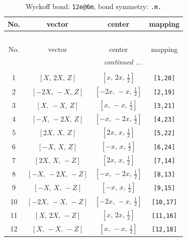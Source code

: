 \documentclass[fleqn,8pt]{jsarticle}
\begin{document}
\renewcommand{\arraystretch}{1.2}
\begin{longtable}{cccc}
\caption{Wyckoff bond: {\tt 12e@6m}, bond symmetry: {\tt .m.}}
 \\
 \hline \hline
No. & vector & center & mapping \\ \hline \endfirsthead

\multicolumn{3}{l}{\tablename\ \thetable{}} \\
 \hline \hline
No. & vector & center & mapping \\ \hline \endhead

 \hline \hline
\multicolumn{3}{r}{\footnotesize\it continued ...} \\ \endfoot

 \hline \hline
\multicolumn{3}{r}{} \\ \endlastfoot

1 & $\left[ X,\, 2 X,\, Z \right]$ & $\left[ x,\, 2 x,\, \frac{1}{2} \right]$ & {\tt [1,20]} \\ \hline
2 & $\left[ - 2 X,\, - X,\, Z \right]$ & $\left[ - 2 x,\, - x,\, \frac{1}{2} \right]$ & {\tt [2,19]} \\ \hline
3 & $\left[ X,\, - X,\, Z \right]$ & $\left[ x,\, - x,\, \frac{1}{2} \right]$ & {\tt [3,21]} \\ \hline
4 & $\left[ - X,\, - 2 X,\, Z \right]$ & $\left[ - x,\, - 2 x,\, \frac{1}{2} \right]$ & {\tt [4,23]} \\ \hline
5 & $\left[ 2 X,\, X,\, Z \right]$ & $\left[ 2 x,\, x,\, \frac{1}{2} \right]$ & {\tt [5,22]} \\ \hline
6 & $\left[ - X,\, X,\, Z \right]$ & $\left[ - x,\, x,\, \frac{1}{2} \right]$ & {\tt [6,24]} \\ \hline
7 & $\left[ 2 X,\, X,\, - Z \right]$ & $\left[ 2 x,\, x,\, \frac{1}{2} \right]$ & {\tt [7,14]} \\ \hline
8 & $\left[ - X,\, - 2 X,\, - Z \right]$ & $\left[ - x,\, - 2 x,\, \frac{1}{2} \right]$ & {\tt [8,13]} \\ \hline
9 & $\left[ - X,\, X,\, - Z \right]$ & $\left[ - x,\, x,\, \frac{1}{2} \right]$ & {\tt [9,15]} \\ \hline
10 & $\left[ - 2 X,\, - X,\, - Z \right]$ & $\left[ - 2 x,\, - x,\, \frac{1}{2} \right]$ & {\tt [10,17]} \\ \hline
11 & $\left[ X,\, 2 X,\, - Z \right]$ & $\left[ x,\, 2 x,\, \frac{1}{2} \right]$ & {\tt [11,16]} \\ \hline
12 & $\left[ X,\, - X,\, - Z \right]$ & $\left[ x,\, - x,\, \frac{1}{2} \right]$ & {\tt [12,18]} \\
\end{longtable}
\end{document}

